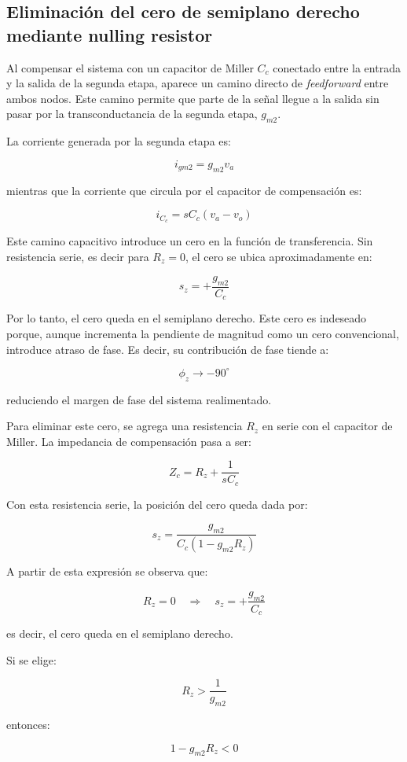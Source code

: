 \subsection*{Eliminación del cero de semiplano derecho mediante nulling resistor}

Al compensar el sistema con un capacitor de Miller \(C_c\) conectado entre la entrada y la salida de la segunda etapa, aparece un camino directo de \textit{feedforward} entre ambos nodos. Este camino permite que parte de la señal llegue a la salida sin pasar por la transconductancia de la segunda etapa, \(g_{m2}\).

La corriente generada por la segunda etapa es:

\[
i_{gm2}=g_{m2}v_a
\]

mientras que la corriente que circula por el capacitor de compensación es:

\[
i_{C_c}=sC_c(v_a-v_o)
\]

Este camino capacitivo introduce un cero en la función de transferencia. Sin resistencia serie, es decir para \(R_z=0\), el cero se ubica aproximadamente en:

\[
s_z=+\frac{g_{m2}}{C_c}
\]

Por lo tanto, el cero queda en el semiplano derecho. Este cero es indeseado porque, aunque incrementa la pendiente de magnitud como un cero convencional, introduce atraso de fase. Es decir, su contribución de fase tiende a:

\[
\phi_z \rightarrow -90^\circ
\]

reduciendo el margen de fase del sistema realimentado.

Para eliminar este cero, se agrega una resistencia \(R_z\) en serie con el capacitor de Miller. La impedancia de compensación pasa a ser:

\[
Z_c = R_z+\frac{1}{sC_c}
\]

Con esta resistencia serie, la posición del cero queda dada por:

\[
s_z=
\frac{g_{m2}}{C_c(1-g_{m2}R_z)}
\]

A partir de esta expresión se observa que:

\[
R_z=0
\quad \Rightarrow \quad
s_z=+\frac{g_{m2}}{C_c}
\]

es decir, el cero queda en el semiplano derecho.

Si se elige:

\[
R_z>\frac{1}{g_{m2}}
\]

entonces:

\[
1-g_{m2}R_z<0
\]

